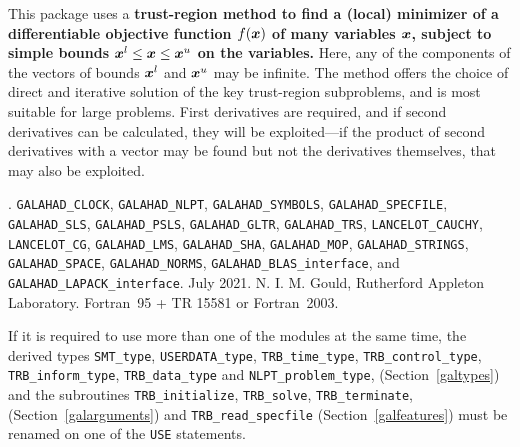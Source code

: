\documentclass{galahad}
\newcommand{\packagename}{TRB}
\newcommand{\fullpackagename}{\libraryname\_\packagename}
\begin{document}
\galheader


\galsummary
This package uses a {\bf trust-region method to find a (local)
minimizer of a differentiable objective function $f({\bm{x}})$
of many variables ${\bm{x}}$, subject to simple bounds 
${\bm{x}}^l \leq {\bm{x}} \leq {\bm{x}}^u$ on the variables.}
Here, any of the components of the vectors of bounds ${\bm{x}}^l$ and ${\bm{x}}^u$ 
may be infinite. The method offers the choice of direct
and iterative solution of the key trust-region subproblems, and
is most suitable for large problems. First derivatives are required,
and if second derivatives can be calculated, they will be exploited---if
the product of second derivatives with a vector may be found but
not the derivatives themselves, that may also be exploited.


\galattributes
\galversions{\tt  \fullpackagename\_single, \fullpackagename\_double}.
\galuses
{\tt GALAHAD\_CLOCK},
{\tt GALAHAD\_NLPT},
{\tt GALAHAD\_SY\-M\-BOLS},
{\tt GALAHAD\_SPECFILE},
{\tt GALAHAD\_SLS},
{\tt GALAHAD\_PSLS},
{\tt GALAHAD\_GLTR},
{\tt GALAHAD\_TRS},
{\tt LANCELOT\_\-CAUCHY},
{\tt LANCELOT\_CG},
{\tt GALAHAD\_LMS},
{\tt GALAHAD\_SHA},
{\tt GALAHAD\_MOP},
{\tt GALAHAD\_STRINGS},
{\tt GALAHAD\_SPACE},
{\tt GALAHAD\_\-NORMS},
{\tt GALAHAD\_BLAS\_interface},
and
{\tt GALAHAD\_LAPACK\_interface}.
\galdate July 2021.
\galorigin N. I. M. Gould, Rutherford Appleton Laboratory.
\gallanguage Fortran~95 + TR 15581 or Fortran~2003.


\galhowto



\noindent
If it is required to use more than one of the modules at the same time, 
the derived types
{\tt SMT\_type},
{\tt USERDATA\_type},
{\tt \packagename\_time\_\-type},
{\tt \packagename\_control\_type},
{\tt \packagename\_inform\_type},
{\tt \packagename\_data\_type}
and
{\tt NLPT\_problem\_type},
(Section~\ref{galtypes})
and the subroutines
{\tt \packagename\_initialize},
{\tt \packagename\_\-solve},
{\tt \packagename\_terminate},
(Section~\ref{galarguments})
and
{\tt \packagename\_read\_specfile}
(Section~\ref{galfeatures})
must be renamed on one of the {\tt USE} statements.

\end{document}

